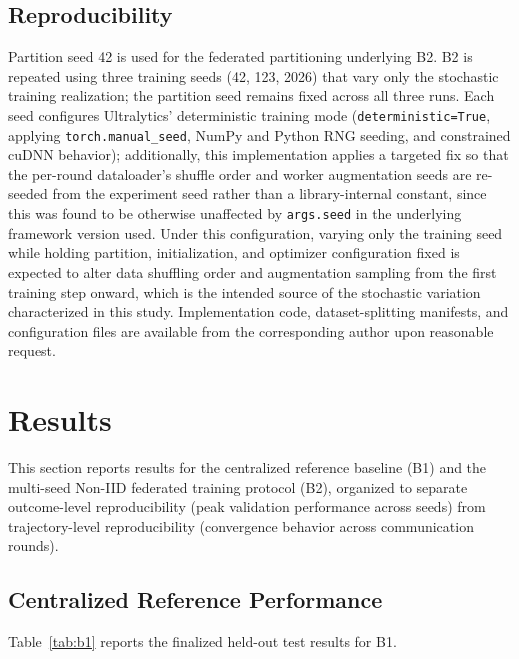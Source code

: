 \documentclass[11pt]{article}
\begin{document}
\subsection{Reproducibility}
Partition seed 42 is used for the federated partitioning underlying B2. B2 is repeated using three training seeds (42, 123, 2026) that vary only the stochastic training realization; the partition seed remains fixed across all three runs. Each seed configures Ultralytics' deterministic training mode (\texttt{deterministic=True}, applying \texttt{torch.manual\_seed}, NumPy and Python RNG seeding, and constrained cuDNN behavior); additionally, this implementation applies a targeted fix so that the per-round dataloader's shuffle order and worker augmentation seeds are re-seeded from the experiment seed rather than a library-internal constant, since this was found to be otherwise unaffected by \texttt{args.seed} in the underlying framework version used. Under this configuration, varying only the training seed while holding partition, initialization, and optimizer configuration fixed is expected to alter data shuffling order and augmentation sampling from the first training step onward, which is the intended source of the stochastic variation characterized in this study. Implementation code, dataset-splitting manifests, and configuration files are available from the corresponding author upon reasonable request.

\section{Results}

This section reports results for the centralized reference baseline (B1) and the multi-seed Non-IID federated training protocol (B2), organized to separate outcome-level reproducibility (peak validation performance across seeds) from trajectory-level reproducibility (convergence behavior across communication rounds).

\subsection{Centralized Reference Performance}
Table~\ref{tab:b1} reports the finalized held-out test results for B1.
\end{document}
